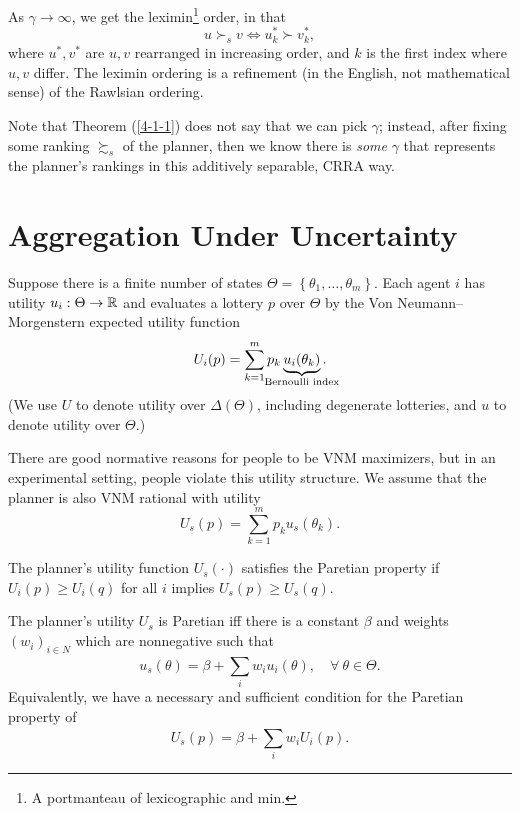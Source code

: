 As $\gamma\to \infty$, we get the leximin\footnote{A portmanteau of lexicographic and min.} order, in that \[
	u \succ_s v \iff u_k^* \succ v_k^*
,\] 
where $u^*,v^*$ are $u,v$ rearranged in increasing order, and $k$ is the first index where $u,v$ differ. The leximin ordering is a refinement (in the English, not mathematical sense) of the Rawlsian ordering.

Note that Theorem (\ref{4-1-1}) does not say that we can pick $\gamma$; instead, after fixing some ranking $\succsim_s$ of the planner, then we know there is \emph{some} $\gamma$ that represents the planner's rankings in this additively separable, CRRA way.

\section{Aggregation Under Uncertainty}

Suppose there is a finite number of states $\Theta = \left\{\theta_1,\ldots,\theta_m\right\}$. Each agent $i$ has utility $u_i: \Theta \to \mathbb{R}$ and evaluates a lottery $p$ over $\Theta$ by the Von Neumann--Morgenstern expected utility function \[
	U_i(p) = \sum\limits_{k=1}^{m} p_k \underbrace{u_i (\theta_k)}_{\mathclap{\text{Bernoulli index}}}
.\] 
(We use $U$ to denote utility over $\Delta(\Theta)$, including degenerate lotteries, and $u$ to denote utility over $\Theta$.)

There are good normative reasons for people to be VNM maximizers, but in an experimental setting, people violate this utility structure.
We assume that the planner is also VNM rational with utility \[
	U_s(p) = \sum\limits_{k=1}^{m} p_k u_s(\theta_k)
.\] 

\begin{definition}
	The planner's utility function $U_s(\cdot)$ satisfies the Paretian property if $U_i(p) \ge U_i(q)$ for all $i$ implies $U_s(p) \ge U_s(q)$.
\end{definition}

\begin{theorem}[Harsanyi]
	The planner's utility $U_s$ is Paretian iff there is a constant $\beta$ and weights $\left( w_i \right)_{i \in N}$ which are nonnegative such that \[
		u_s(\theta) = \beta + \sum\limits_{i}^{} w_i u_i(\theta), \quad \forall\  \theta \in \Theta
	.\] Equivalently, we have a necessary and sufficient condition for the Paretian property of \[
		U_s(p) = \beta + \sum\limits_{i}^{} w_i U_i(p)
	.\] 
\end{theorem}


